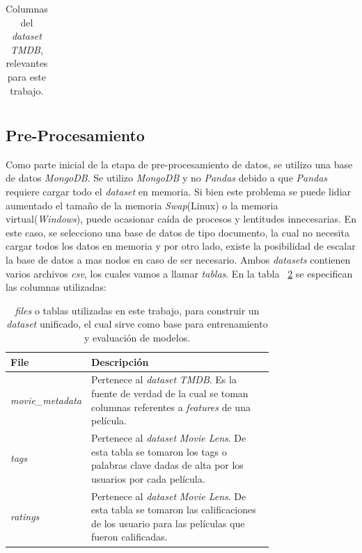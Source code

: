 \documentclass[11pt,a4paper,twoside]{thesis}
\begin{document}
\begin{table}[!htb]
\begin{tabular}{l | p{0.6\linewidth}}
	\hline
	\end{tabular}
	\caption{
		Columnas del \textit{dataset} \textit{TMDB}, relevantes para este trabajo.
	}
	\label{table:tmdbColumns}
\end{table}



\clearpage

\subsection{Pre-Procesamiento}

Como parte inicial de la etapa de pre-procesamiento de datos, se utilizo una base de datos \textit{MongoDB}. Se utilizo \textit{MongoDB} y no \textit{Pandas} debido a que \textit{Pandas} requiere cargar todo el \textit{dataset} en memoria. Si bien este problema se puede lidiar aumentado el tamaño de la memoria \textit{Swap}(Linux) o la memoria virtual(\textit{Windows}), puede ocasionar caída de procesos y lentitudes innecesarias. En este caso, se selecciono una base de datos de tipo documento, la cual no necesita cargar todos los datos en memoria y por otro lado, existe la posibilidad de escalar la base de datos a mas nodos en caso de ser necesario.
Ambos \textit{datasets} contienen varios archivos \textit{csv}, los cuales vamos a llamar \textit{tablas}. En la tabla ~\ref{table:tableRatings} se especifican las columnas utilizadas:

\begin{table}[!htb]
	\centering
	\footnotesize
	\begin{tabular}{l | p{0.75\linewidth}}
	\hline
		File              & Descripción \\
	\hline
	\textit{movie\_metadata} & Pertenece al \textit{dataset} \textit{TMDB}. Es la fuente de verdad de la cual se toman columnas referentes a \textit{features} de una película. \\
	\textit{tags}            & Pertenece al \textit{dataset} \textit{Movie Lens}. De esta tabla se tomaron los tags o palabras clave dadas de alta por los usuarios por cada película. \\
	\textit{ratings}         & Pertenece al \textit{dataset} \textit{Movie Lens}. De esta tabla se tomaron las calificaciones de los usuario para las películas que fueron calificadas. \\
	\hline
	\end{tabular}
	\caption{
		\textit{files} o tablas utilizadas en este trabajo, para construir un \textit{dataset} unificado, el cual sirve como base para entrenamiento y evaluación de modelos.
	}
	\label{table:tableRatings}
\end{table}
\end{document}
